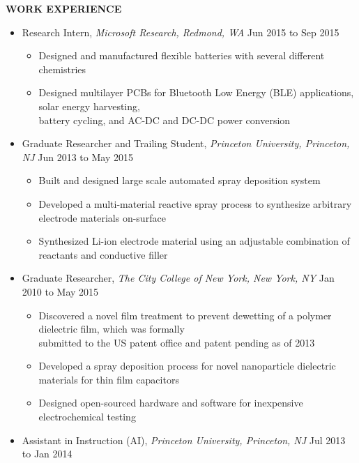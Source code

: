 \documentclass[9pt,letterpaper]{article}
\begin{document}
{\singlespacing
\noindent \textbf{WORK EXPERIENCE}

{\small
\begin{itemize}
  \item \noindent Research Intern, \emph{Microsoft Research, Redmond, WA} \hfill {\scriptsize Jun 2015 to Sep 2015}
    {\footnotesize\begin{itemize} 
        \item Designed and manufactured flexible batteries with several different chemistries
        \item Designed multilayer PCBs for Bluetooth Low Energy (BLE) applications, solar energy harvesting, \\battery cycling, and AC-DC and DC-DC power conversion
    \end{itemize}}
  \item \noindent Graduate Researcher and Trailing Student, \emph{Princeton University, Princeton, NJ} \hfill {\scriptsize Jun 2013 to May 2015}
    {\footnotesize\begin{itemize} 
        \item Built and designed large scale automated spray deposition system
        \item Developed a multi-material reactive spray process to synthesize arbitrary electrode materials on-surface
        \item Synthesized Li-ion electrode material using an adjustable combination of reactants and conductive filler
    \end{itemize}}
  \item \noindent Graduate Researcher, \emph{The City College of New York, New York, NY} \hfill {\scriptsize Jan 2010 to May 2015}
    {\footnotesize\begin{itemize} 
        \item Discovered a novel film treatment to prevent dewetting of a polymer dielectric film, which was formally \\ submitted to the US patent office and patent pending as of 2013
        \item Developed a spray deposition process for novel nanoparticle dielectric materials for thin film capacitors
        \item Designed open-sourced hardware and software for inexpensive electrochemical testing 
    \end{itemize}}
  \item \noindent Assistant in Instruction (AI), \emph{Princeton University, Princeton, NJ} \hfill {\scriptsize Jul 2013 to Jan 2014} 

\end{itemize}}}
\end{document}
